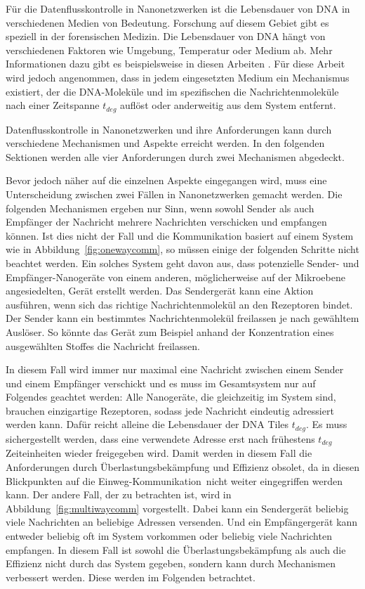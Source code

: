 Für die Datenflusskontrolle in Nanonetzwerken ist die Lebensdauer von DNA in verschiedenen Medien von Bedeutung. Forschung auf diesem Gebiet gibt es speziell in der forensischen Medizin. Die Lebensdauer von DNA hängt von verschiedenen Faktoren wie Umgebung, Temperatur oder Medium ab. Mehr Informationen dazu gibt es beispielsweise in diesen Arbeiten \cite{naef2023dnadegrading, mauvisseau2022dnaenvironmental,abdelhady2021dnadegradation, rahi2021dnadegradation}. Für diese Arbeit wird jedoch angenommen, dass in jedem eingesetzten Medium ein Mechanismus existiert, der die DNA-Moleküle und im spezifischen die Nachrichtenmoleküle nach einer Zeitspanne $t_{deg}$ auflöst oder anderweitig aus dem System entfernt.

Datenflusskontrolle in Nanonetzwerken und ihre Anforderungen kann durch verschiedene Mechanismen und Aspekte erreicht werden. In den folgenden Sektionen werden alle vier Anforderungen durch zwei Mechanismen abgedeckt.

Bevor jedoch näher auf die einzelnen Aspekte eingegangen wird, muss eine Unterscheidung zwischen zwei Fällen in Nanonetzwerken gemacht werden. Die folgenden Mechanismen ergeben nur Sinn, wenn sowohl Sender als auch Empfänger der Nachricht mehrere Nachrichten verschicken und empfangen können. Ist dies nicht der Fall und die Kommunikation basiert auf einem System wie in Abbildung~\ref{fig:onewaycomm}, so müssen einige der folgenden Schritte nicht beachtet werden. Ein solches System geht davon aus, dass potenzielle Sender- und Empfänger-Nanogeräte von einem anderen, möglicherweise auf der Mikroebene angesiedelten, Gerät erstellt werden. Das Sendergerät kann eine Aktion ausführen, wenn sich das richtige Nachrichtenmolekül an den Rezeptoren bindet. Der Sender kann ein bestimmtes Nachrichtenmolekül freilassen je nach gewähltem Auslöser. So könnte das Gerät zum Beispiel anhand der Konzentration eines ausgewählten Stoffes die Nachricht freilassen.

In diesem Fall wird immer nur maximal eine Nachricht zwischen einem Sender und einem Empfänger verschickt und es muss im Gesamtsystem nur auf Folgendes geachtet werden: Alle Nanogeräte, die gleichzeitig im System sind, brauchen einzigartige Rezeptoren, sodass jede Nachricht eindeutig adressiert werden kann. Dafür reicht alleine die Lebensdauer der DNA Tiles $t_{deg}$. 
Es muss sichergestellt werden, dass eine verwendete Adresse erst nach frühestens $t_{deg}$ Zeiteinheiten wieder freigegeben wird. Damit werden in diesem Fall die Anforderungen durch Überlastungsbekämpfung und Effizienz obsolet, da in diesen Blickpunkten auf die \glqq Einweg-Kommunikation\grqq\, nicht weiter eingegriffen werden kann. 
Der andere Fall, der zu betrachten ist, wird in Abbildung~\ref{fig:multiwaycomm} vorgestellt. 
Dabei kann ein Sendergerät beliebig viele Nachrichten an beliebige Adressen versenden. 
Und ein Empfängergerät kann entweder beliebig oft im System vorkommen oder beliebig viele Nachrichten empfangen. 
In diesem Fall ist sowohl die Überlastungsbekämpfung als auch die Effizienz nicht durch das System gegeben, sondern kann durch Mechanismen verbessert werden. 
Diese werden im Folgenden betrachtet.

